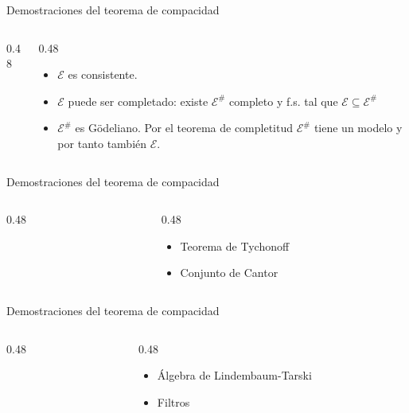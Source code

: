 \begin{frame}{Demostraciones del teorema de compacidad}
   \begin{columns}
      \begin{column}{0.48\textwidth}
         
      \end{column}
      \begin{column}{0.48\textwidth}
         \begin{itemize}
            \item <2-> $\mathcal{E}$ es consistente.
            \item <3-> $\mathcal{E}$ puede ser completado: existe $\mathcal{E}^{\#}$ completo y f.s. tal que $\mathcal{E}\subseteq\mathcal{E}^{\#}$
            \item <4-> $\mathcal{E}^{\#}$ es Gödeliano. Por el teorema de completitud $\mathcal{E}^{\#}$ tiene un modelo y por tanto también $\mathcal{E}$.
         \end{itemize}
      \end{column}
   \end{columns}
\end{frame}
\begin{frame}{Demostraciones del teorema de compacidad}
   \begin{columns}
      \begin{column}{0.48\textwidth}
         
      \end{column}
      \begin{column}{0.48\textwidth}
         \begin{itemize}
            \item Teorema de Tychonoff
            \item Conjunto de Cantor
         \end{itemize}
      \end{column}
   \end{columns}
\end{frame}
\begin{frame}{Demostraciones del teorema de compacidad}
    \begin{columns}
      \begin{column}{0.48\textwidth}
         
      \end{column}
      \begin{column}{0.48\textwidth}
         \begin{itemize}
            \item Álgebra de Lindembaum-Tarski
            \item Filtros
         \end{itemize}
      \end{column}
   \end{columns}
\end{frame}
